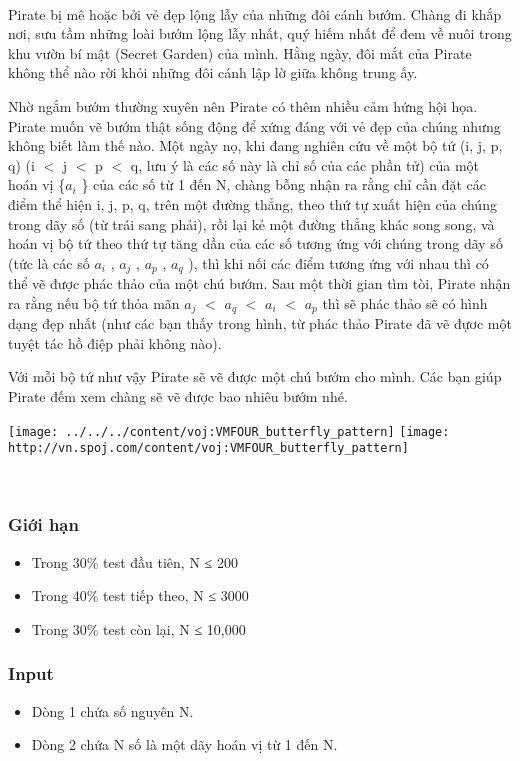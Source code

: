

 

Pirate bị mê hoặc bởi vẻ đẹp lộng lẫy của những đôi cánh bướm. Chàng đi khắp nơi, sưu tầm những loài bướm lộng lẫy nhất, quý hiếm nhất để đem về nuôi trong khu vườn bí mật (Secret Garden) của mình. Hằng ngày, đôi mắt của Pirate không thể nào rời khỏi những đôi cánh lập lờ giữa không trung ấy.

Nhờ ngắm bướm thường xuyên nên Pirate có thêm nhiều cảm hứng hội họa. Pirate muốn vẽ bướm thật sống động để xứng đáng với vẻ đẹp của chúng nhưng không biết làm thế nào. Một ngày nọ, khi đang nghiên cứu về một bộ tứ (i, j, p, q) (i $<$ j $<$ p $<$ q, lưu ý là các số này là chỉ số của các phần tử) của một hoán vị \{$a_{i}$ \} của các số từ 1 đến N, chàng bỗng nhận ra rằng chỉ cần đặt các điểm thể hiện i, j, p, q, trên một đường thẳng, theo thứ tự xuất hiện của chúng trong dãy số (từ trái sang phải), rồi lại kẻ một đường thẳng khác song song, và hoán vị bộ tứ theo thứ tự tăng dần của các số tương ứng với chúng trong dãy số (tức là các số $a_{i}$ , $a_{j}$ , $a_{p}$ , $a_{q}$ ), thì khi nối các điểm tương ứng với nhau thì có thể vẽ được phác thảo của một chú bướm. Sau một thời gian tìm tòi, Pirate nhận ra rằng nếu bộ tứ thỏa mãn $a_{j}$ $<$ $a_{q}$ $<$ $a_{i}$ $<$ $a_{p}$ thì sẽ phác thảo sẽ có hình dạng đẹp nhất (như các bạn thấy trong hình, từ phác thảo Pirate đã vẽ đựơc một tuyệt tác hồ điệp phải không nào).

Với mỗi bộ tứ như vậy Pirate sẽ vẽ được một chú bướm cho mình. Các bạn giúp Pirate đếm xem chàng sẽ vẽ được bao nhiêu bướm nhé.


\texttt{[image: ../../../content/voj:VMFOUR\_butterfly\_pattern]}
\texttt{[image: http://vn.spoj.com/content/voj:VMFOUR\_butterfly\_pattern]}
\begin{itemize}
\end{itemize}

 

\subsubsection{Giới hạn}
\begin{itemize}
	\item Trong 30\% test đầu tiên, N ≤ 200
	\item Trong 40\% test tiếp theo, N ≤ 3000
	\item Trong 30\% test còn lại, N ≤ 10,000
\end{itemize}

\subsubsection{Input}
\begin{itemize}
	\item Dòng 1 chứa số nguyên N.
	\item Dòng 2 chứa N số là một dãy hoán vị từ 1 đến N.
\end{itemize}

